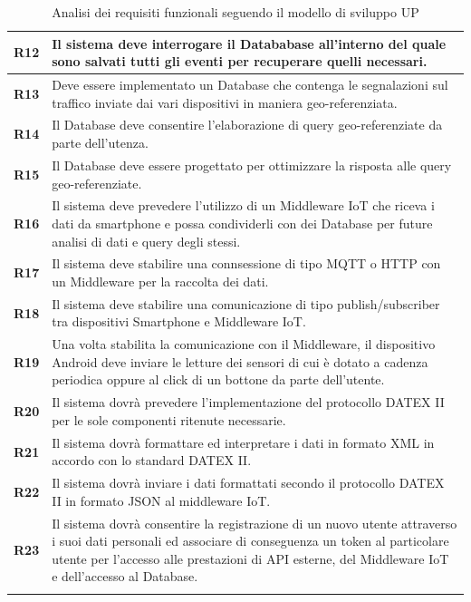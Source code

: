 \begin{longtable}{|m{2cm}|m{12cm}|}
			\hline
			\textbf{R12} &   Il sistema deve interrogare il Datababase all'interno del quale sono salvati tutti gli eventi per recuperare quelli necessari.  \\
			\hline
			\textbf{R13} &   Deve essere implementato un Database che contenga le segnalazioni sul traffico inviate dai vari dispositivi in maniera geo-referenziata.  \\
			\hline
			\textbf{R14} &   Il Database deve consentire l'elaborazione di query geo-referenziate da parte dell'utenza.  \\
			\hline
			\textbf{R15} &   Il Database deve essere progettato per ottimizzare la risposta alle query geo-referenziate.  \\
			\hline
			\textbf{R16} &   Il sistema deve prevedere l'utilizzo di un Middleware IoT che riceva i dati da smartphone e possa condividerli con dei Database per future analisi di dati e query degli stessi.  \\
			\hline
			\textbf{R17} &   Il sistema deve stabilire una connsessione di tipo MQTT o HTTP con un Middleware per la raccolta dei dati.  \\
			\hline
			\textbf{R18} &   Il sistema deve stabilire una comunicazione di tipo publish/subscriber tra dispositivi Smartphone e Middleware IoT.  \\
			\hline
			\textbf{R19} &   Una volta stabilita la comunicazione con il Middleware, il dispositivo Android deve inviare le letture dei sensori di cui è dotato a cadenza periodica oppure al click di un bottone da parte dell'utente.  \\
			\hline
			\textbf{R20} &   Il sistema dovrà prevedere l'implementazione del protocollo DATEX II per le sole componenti ritenute necessarie.  \\
			\hline
			\textbf{R21} &   Il sistema dovrà formattare ed interpretare i dati in formato XML in accordo con lo standard DATEX II.  \\
			\hline
			\textbf{R22} &   Il sistema dovrà inviare i dati formattati secondo il protocollo DATEX II in formato JSON al middleware IoT.  \\
			\hline
			\textbf{R23} &   Il sistema dovrà consentire la registrazione di un nuovo utente attraverso i suoi dati personali ed associare di conseguenza un token al particolare utente per l'accesso alle prestazioni di API esterne, del Middleware IoT e dell'accesso al Database.  \\
			\hline
		\caption{Analisi dei requisiti funzionali seguendo il modello di sviluppo UP}
		\label{tabel:requisiti_software}
\end{longtable}

